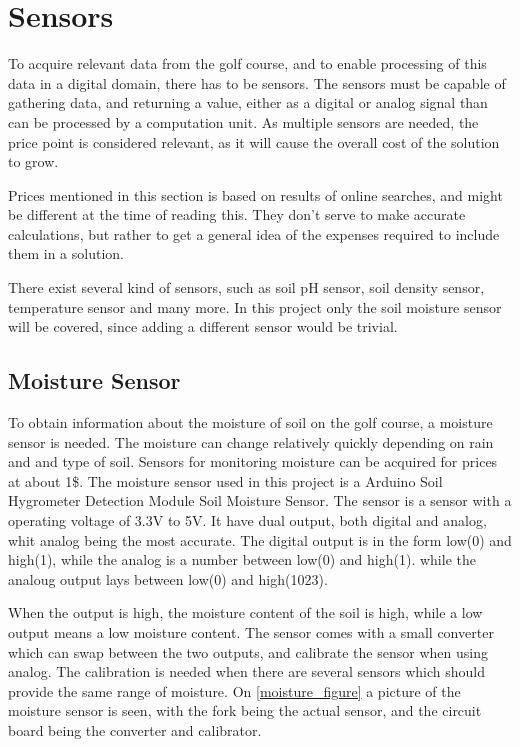 \section{Sensors}
To acquire relevant data from the golf course, and to enable processing of this data in a digital domain, there has to be sensors.
The sensors must be capable of gathering data, and returning a value, either as a digital or analog signal than can be processed by a computation unit.
As multiple sensors are needed, the price point is considered relevant, as it will cause the overall cost of the solution to grow.

Prices mentioned in this section is based on results of online searches, and might be different at the time of reading this.
They don't serve to make accurate calculations, but rather to get a general idea of the expenses required to include them in a solution.

There exist several kind of sensors, such as soil pH sensor, soil density sensor, temperature sensor and many more. In this project only the soil moisture sensor will be covered, since adding a different sensor would be trivial.

\subsection{Moisture Sensor}
To obtain information about the moisture of soil on the golf course, a moisture sensor is needed.
The moisture can change relatively quickly depending on rain and and type of soil.
Sensors for monitoring moisture can be acquired for prices at about 1\$.
The moisture sensor used in this project is a Arduino Soil Hygrometer Detection Module Soil Moisture Sensor.
The sensor is a sensor with a operating voltage of 3.3V to 5V.
It have dual output, both digital and analog, whit analog being the most accurate.
The digital output is in the form low(0) and high(1), while the analog is a number between low(0) and high(1)\cite{moisture}.
while the analoug output lays between low(0) and high(1023).

When the output is high, the moisture content of the soil is high, while a low output means a low moisture content.
The sensor comes with a small converter which can swap between the two outputs, and calibrate the sensor when using analog.
The calibration is needed when there are several sensors which should provide the same range of moisture.
On \ref{moisture_figure} a picture of the moisture sensor is seen, with the fork being the actual sensor, and the circuit board being the converter and calibrator. 

